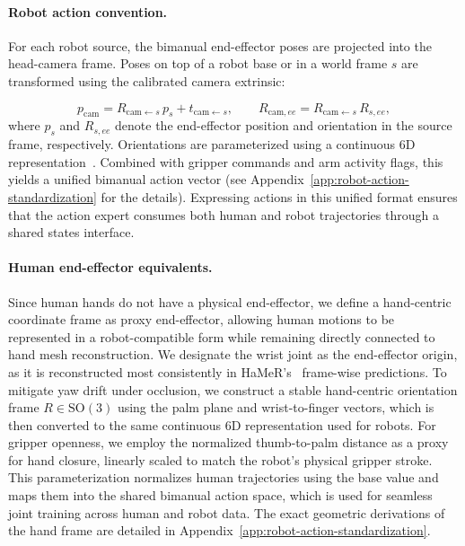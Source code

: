 \documentclass{article}
\begin{document}
\paragraph{Robot action convention.}
For each robot source, the bimanual end-effector poses are projected into the head-camera frame. Poses on top of a robot base or in a world frame $s$ are transformed using the calibrated camera extrinsic:

\begin{equation}
  p_{\mathrm{cam}} = R_{\mathrm{cam}\leftarrow s}\, p_s + t_{\mathrm{cam}\leftarrow s},
  \qquad
  R_{\mathrm{cam},ee} = R_{\mathrm{cam}\leftarrow s}\, R_{s,ee},
  \label{eq:cam-transform}
\end{equation}
where $p_s$ and $R_{s,ee}$ denote the end-effector position and orientation in the source frame, respectively. Orientations are parameterized using a continuous 6D representation~\cite{zhou2019continuity}. Combined with gripper commands and arm activity flags, this yields a unified bimanual action vector (see Appendix~\ref{app:robot-action-standardization} for the details). Expressing actions in this unified format ensures that the action expert consumes both human and robot trajectories through a shared states interface.

\paragraph{Human end-effector equivalents.}
Since human hands do not have a physical end-effector, we define a hand-centric coordinate frame as proxy end-effector, allowing human motions to be represented in a robot-compatible form while remaining directly connected to hand mesh reconstruction.
We designate the wrist joint as the end-effector origin, as it is reconstructed most consistently in HaMeR's~\cite{pavlakos2024reconstructing} frame-wise predictions. To mitigate yaw drift under occlusion, we construct a stable hand-centric orientation frame $R \in \mathrm{SO}(3)$ using the palm plane and wrist-to-finger vectors, which is then converted to the same continuous 6D representation used for robots. For gripper openness, we employ the normalized thumb-to-palm distance as a proxy for hand closure, linearly scaled to match the robot's physical gripper stroke. This parameterization normalizes human trajectories using the base value and maps them into the shared bimanual action space, which is used for seamless joint training across human and robot data. The exact geometric derivations of the hand frame are detailed in Appendix~\ref{app:robot-action-standardization}.
\end{document}
